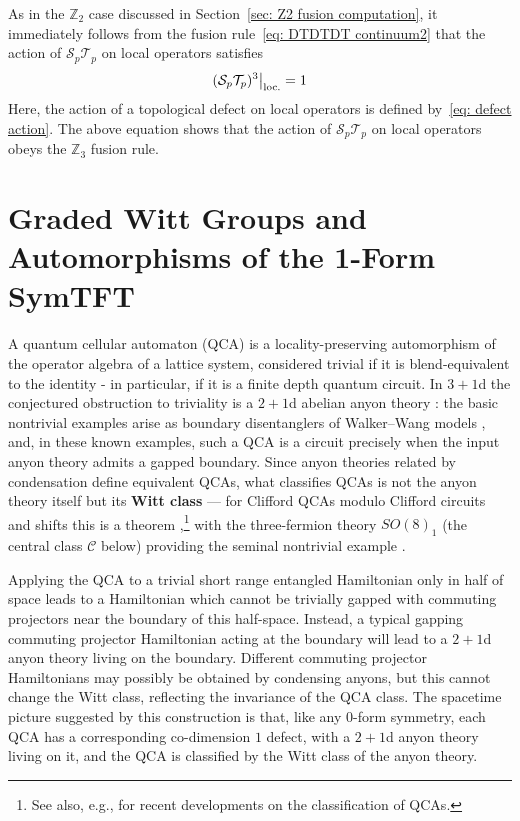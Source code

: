 \documentclass[aps,twocolumn,prx,floatfix,preprintnumbers, nofootinbib,10pt]{revtex4-2}
\numberwithin{equation}{section}
\theoremstyle{definition}
\theoremstyle{remark}
\theoremstyle{claim}
\newcommand{\be}{\begin{equation}}
\newcommand{\ee}{\end{equation}}
\newcommand{\cC}{\mathcal{C}}
\newcommand{\mc}[1]{\mathcal{#1}}
\newcommand\restr[2]{{%
  \left.\kern-\nulldelimiterspace %
  #1 %
  \right|_{#2} %
}}
\newcommand{\opaction}[1]{\restr{#1}{\text{loc.}}}
\begin{document}
As in the $\mathbb{Z}_2$ case discussed in Section~\ref{sec: Z2 fusion computation}, it immediately follows from the fusion rule~\eqref{eq: DTDTDT continuum2} that the action of $\mathcal{S}_p\mathcal{T}_p$ on local operators satisfies
\be
\opaction{(\mc{S}_p \mc{T}_p)^3} = 1
\ee
Here, the action of a topological defect on local operators is defined by~\eqref{eq: defect action}.
The above equation shows that the action of $\mathcal{S}_p\mathcal{T}_p$ on local operators obeys the $\mathbb{Z}_3$ fusion rule.




\section{Graded Witt Groups and Automorphisms of the 1-Form SymTFT }
\label{sec:Cats}


A quantum cellular automaton (QCA) is a locality-preserving automorphism of the
operator algebra of a lattice system, considered trivial if it is blend-equivalent to the identity - in particular, if it is a finite depth quantum circuit.  
In $3+1$d the conjectured obstruction to triviality is a $2+1$d abelian anyon theory \cite{Shirley_2022}: 
the basic nontrivial
examples arise as boundary disentanglers of Walker--Wang models \cite{walker20123+},
and, in these known examples, such a QCA is a circuit precisely when the input anyon theory admits a gapped
boundary.  
Since anyon theories related by condensation define equivalent QCAs, what
classifies QCAs is not the anyon theory itself but its {\bf Witt class} --- for Clifford
QCAs modulo Clifford circuits and shifts this is a theorem
\cite{Haah_2021,Haah:2022yyo},\footnote{See also, e.g., \cite{Yang:2025jvn, Czajka:2025mme, Ji:2026fka, Yang:2026lnf} for recent developments on the classification of QCAs.} with the three-fermion theory $SO(8)_1$ (the central
class $\cC$ below) providing the seminal nontrivial example
\cite{HaahFidkowskiHastings2023}.  

Applying the QCA to a trivial short range entangled Hamiltonian only in half of space leads to a Hamiltonian which cannot be trivially gapped with commuting projectors near the boundary of this half-space.  Instead, a typical gapping commuting projector Hamiltonian acting at the boundary will lead to a $2+1$d anyon theory living on the boundary.  Different commuting projector Hamiltonians may possibly be obtained by condensing anyons, but this cannot change the Witt class, reflecting the invariance of the QCA class.  The spacetime picture suggested by this construction is that, like any $0$-form symmetry, each QCA has a corresponding co-dimension $1$ defect, with a $2+1$d anyon theory living on it, and the QCA is classified by the Witt class of the anyon theory.
\end{document}
